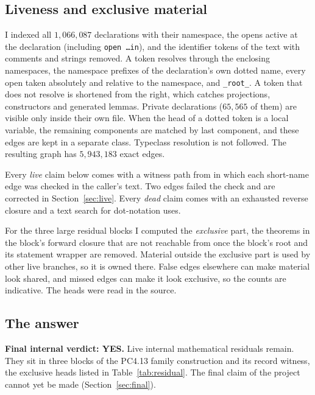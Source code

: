 \documentclass[11pt]{article}
\theoremstyle{remark}
\begin{document}
\subsection{Liveness and exclusive material}

I indexed all $1{,}066{,}087$ declarations with their namespace, the opens active at the declaration (including \texttt{open \ldots in}), and the identifier tokens of the text with comments and strings removed. A token resolves through the enclosing namespaces, the namespace prefixes of the declaration's own dotted name, every open taken absolutely and relative to the namespace, and \texttt{\_root\_}. A token that does not resolve is shortened from the right, which catches projections, constructors and generated lemmas. Private declarations ($65{,}565$ of them) are visible only inside their own file. When the head of a dotted token is a local variable, the remaining components are matched by last component, and these edges are kept in a separate class. Typeclass resolution is not followed. The resulting graph has $5{,}943{,}183$ exact edges.

Every \emph{live} claim below comes with a witness path from  in which each short-name edge was checked in the caller's text. Two edges failed the check and are corrected in Section~\ref{sec:live}. Every \emph{dead} claim comes with an exhausted reverse closure and a text search for dot-notation uses.

For the three large residual blocks I computed the \emph{exclusive} part, the theorems in the block's forward closure that are not reachable from  once the block's root and its statement wrapper are removed. Material outside the exclusive part is used by other live branches, so it is owned there. False edges elsewhere can make material look shared, and missed edges can make it look exclusive, so the counts are indicative. The heads were read in the source.

\subsection{The answer}

\textbf{Final internal verdict: YES.} Live internal mathematical residuals remain. They sit in three blocks of the PC4.13 family construction and its record witness, the exclusive heads listed in Table~\ref{tab:residual}. The final claim of the project cannot yet be made (Section~\ref{sec:final}).
\end{document}
